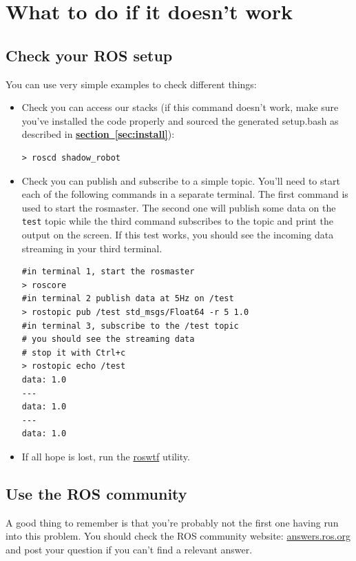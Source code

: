 \documentclass[12pt]{article}
\newcommand{\link}[1]{\hyperref[sec:#1]{\textbf{section~\ref*{sec:#1}}}}
\begin{document}
\section{What to do if it doesn't work}
\label{sec:what-do-if}

\subsection{Check your ROS setup}
\par You can use very simple examples to check different things:
\begin{itemize}
\item Check you can access our stacks (if this command doesn't work, make sure you've installed the code properly and sourced the generated setup.bash as described in \link{install}):
  \begin{lstlisting}[escapeinside='']
> roscd shadow_robot
  \end{lstlisting}

\item Check you can publish and subscribe to a simple topic. You'll need to start each of the following commands in a separate terminal. The first command is used to start the rosmaster. The second one will publish some data on the \texttt{test} topic while the third command subscribes to the topic and print the output on the screen. If this test works, you should see the incoming data streaming in your third terminal.

  \begin{lstlisting}[escapeinside='']
#in terminal 1, start the rosmaster
> roscore
#in terminal 2 publish data at 5Hz on /test
> rostopic pub /test std_msgs/Float64 -r 5 1.0
#in terminal 3, subscribe to the /test topic
# you should see the streaming data
# stop it with Ctrl+c
> rostopic echo /test
data: 1.0
---
data: 1.0
---
data: 1.0
  \end{lstlisting}

\item If all hope is lost, run the \href{http://ros.org/wiki/roswtf}{roswtf} utility.
\end{itemize}

\subsection{Use the ROS community}
\label{sec:use-ros-community}
\par A good thing to remember is that you're probably not the first one having run into this problem. You should check the ROS community website: \href{http://answers.ros.org}{answers.ros.org} and post your question if you can't find a relevant answer.
\end{document}

